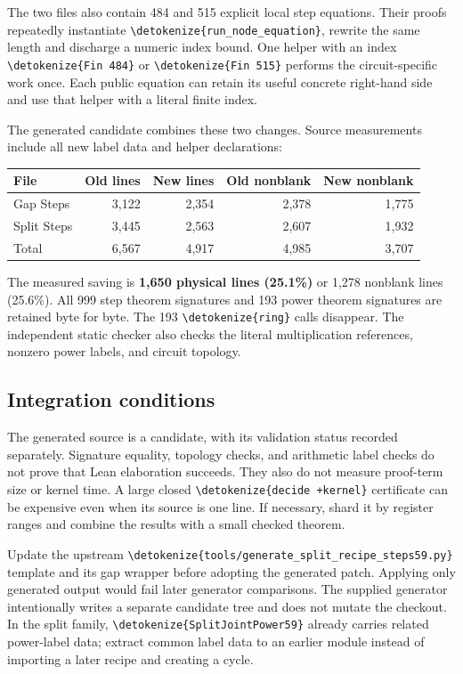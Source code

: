 \documentclass[11pt,letterpaper]{article}
\newcommand{\code}[1]{\expandafter\nolinkurl\expandafter{\detokenize{#1}}}
\begin{document}
The two files also contain 484 and 515 explicit local step equations. Their proofs repeatedly instantiate \code{run_node_equation}, rewrite the same length and discharge a numeric index bound. One helper with an index \code{Fin 484} or \code{Fin 515} performs the circuit-specific work once. Each public equation can retain its useful concrete right-hand side and use that helper with a literal finite index.

The generated candidate combines these two changes. Source measurements include all new label data and helper declarations:

\begin{center}
\begin{tabular}{lrrrr}
\toprule
File & Old lines & New lines & Old nonblank & New nonblank\\
\midrule
Gap Steps & 3,122 & 2,354 & 2,378 & 1,775\\
Split Steps & 3,445 & 2,563 & 2,607 & 1,932\\
\midrule
Total & 6,567 & 4,917 & 4,985 & 3,707\\
\bottomrule
\end{tabular}
\end{center}

The measured saving is \textbf{1,650 physical lines (25.1\%)} or 1,278 nonblank lines (25.6\%). All 999 step theorem signatures and 193 power theorem signatures are retained byte for byte. The 193 \code{ring} calls disappear. The independent static checker also checks the literal multiplication references, nonzero power labels, and circuit topology.

\subsection{Integration conditions}

The generated source is a candidate, with its validation status recorded separately. Signature equality, topology checks, and arithmetic label checks do not prove that Lean elaboration succeeds. They also do not measure proof-term size or kernel time. A large closed \code{decide +kernel} certificate can be expensive even when its source is one line. If necessary, shard it by register ranges and combine the results with a small checked theorem.

Update the upstream \code{tools/generate_split_recipe_steps59.py} template and its gap wrapper before adopting the generated patch. Applying only generated output would fail later generator comparisons. The supplied generator intentionally writes a separate candidate tree and does not mutate the checkout. In the split family, \code{SplitJointPower59} already carries related power-label data; extract common label data to an earlier module instead of importing a later recipe and creating a cycle.
\end{document}
